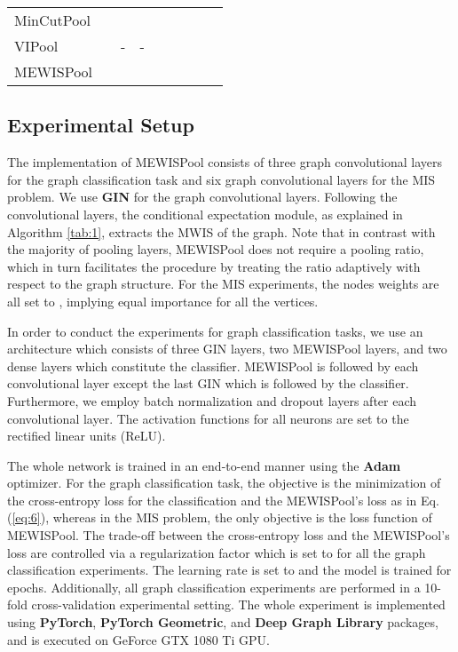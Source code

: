 \documentclass{article}
\begin{document}
\begin{table}[t]
{\begin{tabular}{lcccccccc}
			\large MinCutPool\cite{mincutpool} & \large  & \large  & \large  & \large  & \large  & \large  & \large  & \large  \vspace{0.2cm} \\
			\large VIPool\cite{gxn} & \large  & \large - & \large - & \large  & \large  & \large  & \large  & \large  \vspace{0.2cm} \\
			\midrule
			\large MEWISPool & \large  & \large  & \large  & \large  & \large  & \large  & \large  & \large  \\
			\bottomrule
		\end{tabular}}
	\label{tab:graph_class}
\end{table}

\subsection{Experimental Setup}\label{subsec:exp-setup}
The implementation of MEWISPool consists of three graph convolutional layers for the graph classification task and six graph convolutional layers for the MIS problem. We use \textbf{GIN}\cite{gin} for the graph convolutional layers. Following the convolutional layers, the conditional expectation module, as explained in Algorithm \ref{tab:1}, extracts the MWIS of the graph. Note that in contrast with the majority of pooling layers, MEWISPool does not require a pooling ratio, which in turn facilitates the procedure by treating the ratio adaptively with respect to the graph structure. For the MIS experiments, the nodes weights are all set to , implying equal importance for all the vertices.

In order to conduct the experiments for graph classification tasks, we use an architecture which consists of three GIN layers, two MEWISPool layers, and two dense layers which constitute the classifier. MEWISPool is followed by each convolutional layer except the last GIN which is followed by the classifier. Furthermore, we employ batch normalization\cite{batchnorm} and dropout\cite{dropout} layers after each convolutional layer. The activation functions for all neurons are set to the rectified linear units (ReLU).

The whole network is trained in an end-to-end manner using the \textbf{Adam}\cite{adam} optimizer. For the graph classification task, the objective is the minimization of the cross-entropy loss for the classification and the MEWISPool's loss as in Eq.(\ref{eq:6}), whereas in the MIS problem, the only objective is the loss function of MEWISPool. The trade-off between the cross-entropy loss and the MEWISPool's loss are controlled via a regularization factor which is set to  for all the graph classification experiments. The learning rate is set to  and the model is trained for  epochs. Additionally, all graph classification experiments are performed in a 10-fold cross-validation experimental setting. The whole experiment is implemented using \textbf{PyTorch}\cite{pytorch}, \textbf{PyTorch Geometric}\cite{torchgeom}, and \textbf{Deep Graph Library}\cite{dgl} packages, and is executed on GeForce GTX 1080 Ti GPU.
\end{document}
